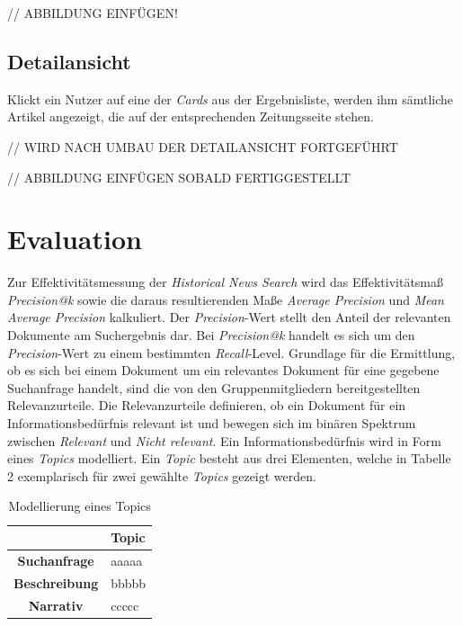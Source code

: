 \documentclass[11pt,a4paper, halfparskip]{scrartcl}
\begin{document}
// ABBILDUNG EINFÜGEN!

\subsection{Detailansicht}

Klickt ein Nutzer auf eine der \textit{Cards} aus der Ergebnisliste, werden ihm sämtliche Artikel angezeigt, die auf der entsprechenden Zeitungsseite stehen.

// WIRD NACH UMBAU DER DETAILANSICHT FORTGEFÜHRT

// ABBILDUNG EINFÜGEN SOBALD FERTIGGESTELLT

\section{Evaluation}

Zur Effektivitätsmessung der \textit{Historical News Search} wird das Effektivitätsmaß \textit{Precision@k} sowie die daraus resultierenden Maße \textit{Average Precision} und \textit{Mean Average Precision} kalkuliert.
Der \textit{Precision}-Wert stellt den Anteil der relevanten Dokumente am Suchergebnis dar. 
Bei \textit{Precision@k} handelt es sich um den \textit{Precision}-Wert zu einem bestimmten \textit{Recall}-Level.
Grundlage für die Ermittlung, ob es sich bei einem Dokument um ein relevantes Dokument für eine gegebene Suchanfrage handelt, sind die von den Gruppenmitgliedern bereitgestellten Relevanzurteile.
Die Relevanzurteile definieren, ob ein Dokument für ein Informationsbedürfnis relevant ist und bewegen sich im binären Spektrum zwischen \textit{Relevant} und \textit{Nicht relevant}.
Ein Informationsbedürfnis wird in Form eines \textit{Topics} modelliert.
Ein \textit{Topic} besteht aus drei Elementen, welche in Tabelle 2 exemplarisch für zwei gewählte \textit{Topics} gezeigt werden. 

\begin{table}[h]
	\centering
	\begin{tabularx}{\textwidth}{|c|p{9.55cm}|}
		\hline 
		& \textbf{Topic} \\ 
		\hline 
		\textbf{Suchanfrage} & aaaaa \\ 
		\hline 
		\textbf{Beschreibung} & bbbbb \\ 
		\hline 
		\textbf{Narrativ} & ccccc \\ 
		\hline 
	\end{tabularx}
\caption{Modellierung eines Topics}
\end{table}
\end{document}
